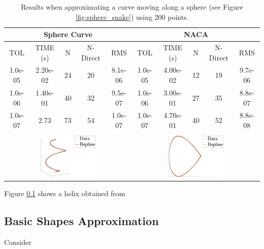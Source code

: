 \documentclass[a4paper,10pt]{article}
\begin{document}
 \begin{table}
 \centering
  \begin{tabular}{||c c c c c ||c c c c c||}
  \hline
  \multicolumn{5}{||c||}{\textbf{Sphere Curve}} & \multicolumn{5}{c||}{\textbf{NACA}}\\
  \hline
 TOL    & TIME (s) & N  & N-Direct & RMS     & TOL    & TIME (s) & N  & N-Direct  & RMS     \\
 \hline
1.0e-05 & 2.20e-02 & 24	& 20 & 8.1e-06 & 1.0e-05 & 4.00e-02 & 12 & 19 & 9.7e-06\\
1.0e-06 & 1.40e-01 & 40	& 32 & 9.5e-07 & 1.0e-06 & 3.00e-01 & 27 & 35 & 8.8e-07\\
1.0e-07 & 2.73 & 73	& 54 & 1.0e-07 & 1.0e-07 & 4.70e-01 & 40 & 52 & 8.8e-08\\
\multicolumn{5}{||c||}{} & \multicolumn{5}{c||}{}\\
\multicolumn{5}{||c||}{\includegraphics[width=0.45\textwidth]{snake-crop}}&
\multicolumn{5}{c||}{\includegraphics[width=0.45\textwidth]{naca27-crop} }\\
\hline
\end{tabular}
\caption{Results when approximating a curve moving along a sphere (see Figure \ref{fig:sphere_snake}) using 200 points.}
 \end{table}

 
 
 
 Figure \ref{} shows a helix obtained from \subsection{Basic Shapes Approximation}
 Consider
 
 



   
   
  





 
 
 

 
 
\end{document}
